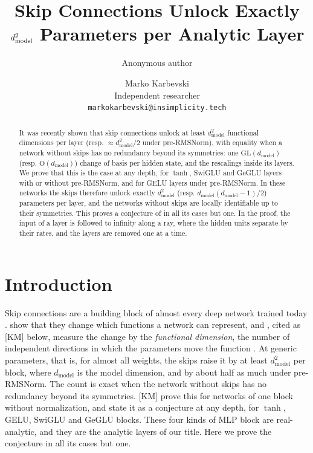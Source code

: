 \documentclass[10pt]{article}
\title{\Large\bfseries\boldmath Skip Connections Unlock Exactly $\dm^2$ Parameters per Analytic Layer}
\author{Anonymous author}
\author{Marko Karbevski\\
Independent researcher\\
{\small\texttt{markokarbevski@insimplicity.tech}}}
\date{}
\theoremstyle{definition}
\theoremstyle{remark}
\newcommand{\dm}{d_{\mathrm{model}}}
\newcommand{\GL}{\mathrm{GL}}
\newcommand{\Ort}{\mathrm{O}}
\begin{document}
\maketitle
\vspace{-1.5em}

\begin{abstract}
It was recently shown that skip connections unlock at least $\dm^2$ functional dimensions per layer (resp. $\approx \dm^2/2$ under pre-RMSNorm), with equality when a network without skips has no redundancy beyond its symmetries: one $\GL(\dm)$ (resp. $\Ort(\dm)$) change of basis per hidden state, and the rescalings inside its layers. We prove that this is the case at any depth, for $\tanh$, SwiGLU and GeGLU layers with or without pre-RMSNorm, and for GELU layers under pre-RMSNorm. In these networks the skips therefore unlock exactly $\dm^2$ (resp. $\dm(\dm-1)/2$) parameters per layer, and the networks without skips are locally identifiable up to their symmetries. This proves a conjecture of \citet{karbevski2026atleast} in all its cases but one. In the proof, the input of a layer is followed to infinity along a ray, where the hidden units separate by their rates, and the layers are removed one at a time.
\end{abstract}

\section{Introduction}\label{sec:intro}

Skip connections are a building block of almost every deep network trained today \citep{he2016resnet}. \citet{mijoski2026worth} show that they change which functions a network can represent, and \citet{karbevski2026atleast}, cited as [KM] below, measure the change by the \emph{functional dimension}, the number of independent directions in which the parameters move the function \citep{grigsby2022functional}. At generic parameters, that is, for almost all weights, the skips raise it by at least $\dm^2$ per block, where $\dm$ is the model dimension, and by about half as much under pre-RMSNorm. The count is exact when the network without skips has no redundancy beyond its symmetries. [KM] prove this for networks of one block without normalization, and state it as a conjecture at any depth, for $\tanh$, GELU, SwiGLU and GeGLU blocks. These four kinds of MLP block are real-analytic, and they are the analytic layers of our title. Here we prove the conjecture in all its cases but one.
\end{document}
